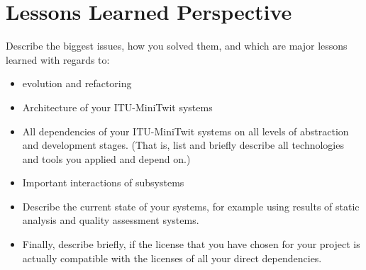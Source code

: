 \section{Lessons Learned Perspective}
Describe the biggest issues, how you solved them, and which are major lessons learned with regards to:
\begin{itemize}
  \item evolution and refactoring
  \item Architecture of your ITU-MiniTwit systems
  \item All dependencies of your ITU-MiniTwit systems on all levels of abstraction and development stages. (That is, list and briefly describe all technologies and tools you applied and depend on.)
  \item Important interactions of subsystems
  \item Describe the current state of your systems, for example using results of static analysis and quality assessment systems.
  \item Finally, describe briefly, if the license that you have chosen for your project is actually compatible with the licenses of all your direct dependencies.
  
\end{itemize}